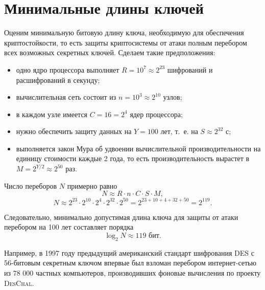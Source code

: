 \section{Минимальные длины ключей}

Оценим минимальную битовую длину ключа, необходимую для обеспечения криптостойкости, то есть защиты криптосистемы от атаки полным перебором всех возможных секретных ключей. Сделаем такие предположения:

\begin{itemize}
    \item одно ядро процессора выполняет $R = 10^7 \approx 2^{23}$ шифрований и расшифрований в секунду;
    \item вычислительная сеть состоит из $n = 10^3 \approx 2^{10}$ узлов;
    \item в каждом узле имеется $C = 16 = 2^4$ ядер процессора;
    \item нужно обеспечить защиту данных на $Y = 100$ лет, т.~е. на $S \approx 2^{32}$ с;
    \item выполняется закон Мура об удвоении вычислительной производительности на единицу стоимости каждые 2 года, то есть производительность вырастет в $M = 2^{Y/2} \approx 2^{50}$ раз.
\end{itemize}

Число переборов $N$ примерно равно
    \[ N \approx R \cdot n \cdot C \cdot S \cdot M, \]
    \[ N \approx 2^{23} \cdot 2^{10} \cdot 2^{4} \cdot 2^{32} \cdot 2^{50} = 2^{23+10+4+32+50} = 2^{119}. \]

Следовательно, минимально допустимая длина ключа для защиты от атаки перебором на 100 лет составляет порядка
    \[ \log_2 N \approx 119\text{ бит}. \]

Например, в 1997 году предыдущий американский стандарт шифрования DES с 56-битовым секретным ключом впервые был взломан перебором интернет-сетью из 78 000 частных компьютеров, производивших фоновые вычисления по проекту \textsc{DesChal}.
